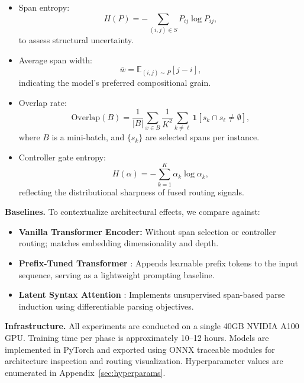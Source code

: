 \begin{itemize}[leftmargin=1.5em]
  \item Span entropy:
  \begin{equation}
  H(P) = -\sum_{(i,j) \in S} P_{ij} \log P_{ij},
  \end{equation}
  to assess structural uncertainty.
  
  \item Average span width:
  \begin{equation}
  \bar{w} = \mathbb{E}_{(i,j) \sim P} [j - i],
  \end{equation}
  indicating the model’s preferred compositional grain.
  
  \item Overlap rate:
  \[
  \text{Overlap}(B) = \frac{1}{|B|} \sum_{x \in B} \frac{1}{K^2} \sum_{k \neq \ell} \mathbf{1}[s_k \cap s_\ell \neq \emptyset],
  \]
  where \(B\) is a mini-batch, and \(\{s_k\}\) are selected spans per instance.
  
  \item Controller gate entropy:
  \[
  H(\alpha) = -\sum_{k=1}^K \alpha_k \log \alpha_k,
  \]
  reflecting the distributional sharpness of fused routing signals.
\end{itemize}

\vspace{0.5em}
\noindent\textbf{Baselines.} To contextualize architectural effects, we compare against:

\begin{itemize}[leftmargin=1.5em]
  \item \textbf{Vanilla Transformer Encoder:} Without span selection or controller routing; matches embedding dimensionality and depth.
  
  \item \textbf{Prefix-Tuned Transformer} \cite{li2021prefix}: Appends learnable prefix tokens to the input sequence, serving as a lightweight prompting baseline.
  
  \item \textbf{Latent Syntax Attention} \cite{kim2019unsupervised}: Implements unsupervised span-based parse induction using differentiable parsing objectives.
\end{itemize}

\vspace{0.5em}
\noindent\textbf{Infrastructure.} All experiments are conducted on a single 40GB NVIDIA A100 GPU. Training time per phase is approximately 10–12 hours. Models are implemented in PyTorch and exported using ONNX traceable modules for architecture inspection and routing visualization. Hyperparameter values are enumerated in Appendix~\ref{sec:hyperparams}.

